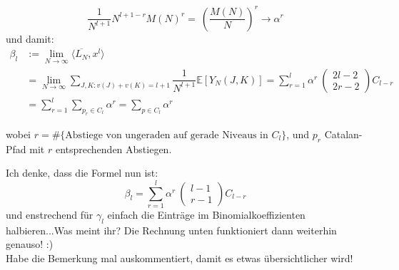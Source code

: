 \documentclass[a4paper, 11pt]{scrreprt}
\newcommand{\EE}{\mathbb{E}}
\begin{document}
	\begin{equation}
		\frac {1}{N^{l+1}} N^{l+1-r}M(N)^r =~ \left( \dfrac{M(N)}{N}\right)^{r}\to \alpha^r
	\end{equation}
und damit:
	\begin{equation}
	\begin{split}
		\beta_l &:= \lim_{N\to\infty} \langle \overline{L_N}, x^l \rangle\\
		&= \lim_{N \to \infty} \sum_{J,K: v(J)+v(K) = l+1} \dfrac{1}{N^{l+1}}\EE[Y_N(J,K)] = \sum_{r=1}^{l} \alpha^r\ \begin{pmatrix} 2l-2\\2r-2\end{pmatrix} C_{l-r} \\
		&= \sum_{r=1}^{l} \sum_{p_{r} \in C_{l}} \alpha^{r} = \sum_{p\in C_l} \alpha^r
	\end{split}
	\end{equation}

wobei \(r=\#\{\text{Abstiege von ungeraden auf gerade Niveaus in } C_l\}\), und \(p_r\) Catalan-Pfad mit \(r\) entsprechenden Abstiegen.

Ich denke, dass die Formel nun ist: 	
	\[\beta_l = \sum_{r=1}^l \alpha^r\ \begin{pmatrix} l-1\\r-1\end{pmatrix} C_{l-r} \]
und enstrechend für \(\gamma_l\) einfach die Einträge im Binomialkoeffizienten halbieren...Was meint ihr? Die Rechnung unten funktioniert dann weiterhin genauso! :)\\
Habe die Bemerkung mal auskommentiert, damit es etwas übersichtlicher wird!



\end{document}
